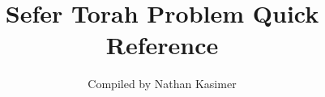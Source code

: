 \documentclass[11pt]{article}
\begin{document}
	
	\title{Sefer Torah Problem Quick Reference}
	
	\author{Compiled by Nathan Kasimer}
	
	\date{}
	
	\maketitle
	\Large

	
\end{document}
